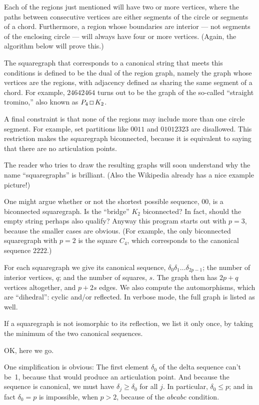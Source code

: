 Each of the regions just mentioned will have two or more vertices,
where the paths between consecutive vertices are either segments of the
circle or segments of a chord. Furthermore, a region whose boundaries
are interior --- not segments of the enclosing circle --- will always have
four or more vertices. (Again, the algorithm below will prove this.)

The squaregraph that corresponds to a canonical string that meets
this conditions is defined to be
the dual of the region graph, namely the graph whose vertices are the
regions, with adjacency defined as sharing the same segment of a chord.
For example, $24642464$ turns out to be the graph of the
so-called ``straight tromino,'' also known as $P_4\sqprod K_2$.

A final constraint is that none of the regions may include more than one
circle segment. For example, set partitions like $0011$ and $01012323$ are
disallowed. This restriction makes the squaregraph biconnected,
because it is equivalent to saying that there are no
articulation points.

The reader who tries to draw the resulting graphs will soon understand
why the name ``squaregraphs'' is brilliant.
(Also the Wikipedia already has a nice example picture!)

One might argue whether or not the shortest possible sequence, $00$,
is a biconnected squaregraph. Is the ``bridge'' $K_2$ biconnected?
In fact, should the empty string perhaps also qualify?
Anyway this program starts out with $p=3$, because the smaller cases
are obvious. (For example, the only biconnected squaregraph with $p=2$
is the square $C_4$, which corresponds to the canonical sequence $2222$.)

For each squaregraph we give its canonical sequence, $\delta_0\delta_1\ldots
\delta_{2p-1}$; the number of interior vertices, $q$; and the number
of squares, $s$. The graph then has $2p+q$ vertices altogether, and
$p+2s$ edges. We also compute the automorphisms, which are ``dihedral'': cyclic
and/or reflected.  In verbose mode, the full graph is listed as well.

If a squaregraph is not isomorphic to its reflection,
we list it only once, by taking the minimum of the
two canonical sequences.

\fi

OK, here we go.

One simplification is obvious: The first element $\delta_0$ of the delta
sequence can't be~1, because that would produce an articulation point.
And because the sequence is canonical, we must have $\delta_j\ge\delta_0$
for all $j$. In particular, $\delta_0\le p$; and in fact $\delta_0=p$
is impossible, when $p>2$, because of the $abcabc$ condition.

